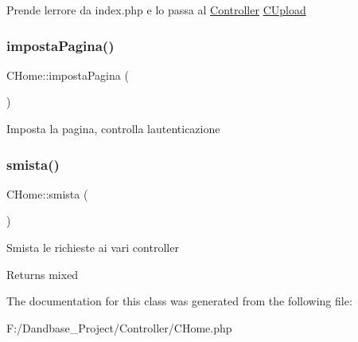 Prende l\textquotesingle{}errore da index.\+php e lo passa al \mbox{\hyperlink{namespace_controller}{Controller}} \mbox{\hyperlink{class_c_upload}{C\+Upload}} \mbox{\label{class_c_home_ac911ed43be450d553e5cc4e86a9d98e5}} 
\subsubsection{\texorpdfstring{imposta\+Pagina()}{impostaPagina()}}
{\footnotesize\ttfamily C\+Home\+::imposta\+Pagina (\begin{DoxyParamCaption}{ }\end{DoxyParamCaption})}

Imposta la pagina, controlla l\textquotesingle{}autenticazione \mbox{\label{class_c_home_a7a0847d615087420fe682217b42d99c9}} 
\subsubsection{\texorpdfstring{smista()}{smista()}}
{\footnotesize\ttfamily C\+Home\+::smista (\begin{DoxyParamCaption}{ }\end{DoxyParamCaption})}

Smista le richieste ai vari controller

\begin{DoxyReturn}{Returns}
mixed 
\end{DoxyReturn}


The documentation for this class was generated from the following file\+:\begin{DoxyCompactItemize}
\item 
F\+:/\+Dandbase\+\_\+\+Project/\+Controller/C\+Home.\+php\end{DoxyCompactItemize}
